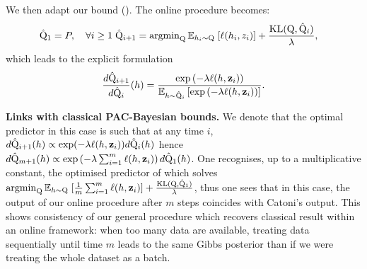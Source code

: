 We then adapt our \OPBTrain bound (). The online procedure becomes:
\begin{align}
  \label{eq: pacb_online_alg_specific_case}
  \hat{\mathrm{Q}}_1= P, \quad \forall i\geq1\; \hat{\mathrm{Q}}_{i+1}&= \operatorname{argmin}_{\mathrm{Q}} \mathbb{E}_{h_i\sim \mathrm{Q}} \; [\ell(h_i,z_i)] + \frac{\operatorname{KL}(\mathrm{Q},\hat{\mathrm{Q}}_{i})}{\lambda},
\end{align}
which leads to the explicit formulation
\begin{align*}
  \frac{d\hat{\mathrm{Q}}_{i+1}}{d\hat{\mathrm{Q}}_{i}}(h) = \frac{\exp\left(-\lambda  \ell(h,\mathbf{z}_i)\right)}{\mathbb{E}_{h\sim \hat{\mathrm{Q}}_{i}}\left[\exp\left(-\lambda  \ell(h,\mathbf{z}_i)\right)\right]}.
\end{align*}

\textbf{Links with classical PAC-Bayesian bounds.} We denote that the optimal predictor in this case is such that at any time $i$, $d\hat{\mathrm{Q}}_{i+1}(h) \propto \exp(-\lambda \ell(h,\mathbf{z}_i))d\hat{\mathrm{Q}}_i(h) $ hence $d\hat{\mathrm{Q}}_{m+1}(h) \propto \exp\left(-\lambda\sum_{i=1}^m \ell(h,\mathbf{z}_i)\right)d\hat{\mathrm{Q}}_1(h) $.
One recognises, up to a multiplicative constant, the optimised predictor of \citet[][Th 1.2.6]{catoni2007pac} which solves
$\operatorname{argmin}_{\mathrm{Q}} \mathbb{E}_{h\sim \mathrm{Q}} \; [\frac{1}{m}\sum_{i=1}^m \ell(h,\mathbf{z}_i)] + \frac{\operatorname{KL}(\mathrm{Q}, \hat{\mathrm{Q}}_{1})}{\lambda}$, thus one sees that in this case, the output of our online procedure after $m$ steps coincides with Catoni's output. This shows consistency of our general procedure which recovers classical result within an online framework: when too many data are available, treating data sequentially until time $m$ leads to the same Gibbs posterior than if we were treating the whole dataset as a batch.


